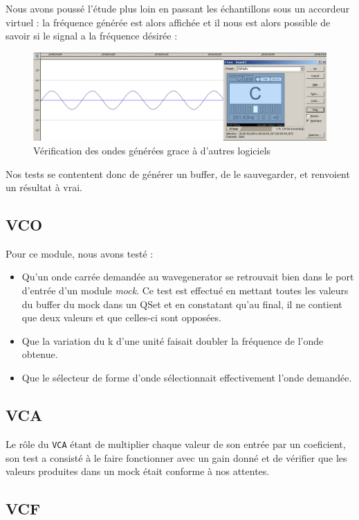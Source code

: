 Nous avons poussé l'étude plus loin en passant les échantillons
sous un accordeur virtuel : la fréquence générée est alors affichée
et il nous est alors possible de savoir si le signal a la fréquence
désirée :

\begin{figure}[htb]
\centering
\includegraphics[width=17cm]{../img/png/testWaveGeneratorSinus.png}
\caption{Vérification des ondes générées grace à d'autres logiciels}
\end{figure}

Nos tests se contentent donc de générer un buffer, de le
sauvegarder, et renvoient un résultat à vrai.

\subsection{VCO}
Pour ce module, nous avons testé :
\begin{itemize}
    \item Qu'un onde  carrée demandée au wavegenerator se retrouvait bien dans le port d'entrée d'un module \textit{mock}. Ce test est effectué en mettant toutes les valeurs du buffer du mock dans un QSet et en constatant qu'au final, il ne contient que deux valeurs et que celles-ci sont opposées.
    \item Que la variation du k d'une unité faisait doubler la fréquence de l'onde obtenue.
    \item Que le sélecteur de forme d'onde sélectionnait effectivement l'onde demandée.
\end{itemize}

\subsection{VCA}
Le rôle du \verb!VCA! étant de multiplier chaque valeur de son entrée par un coeficient, son test a consisté à le faire fonctionner avec un gain donné et de vérifier que les valeurs produites dans un mock était conforme à nos attentes.

\subsection{VCF}

